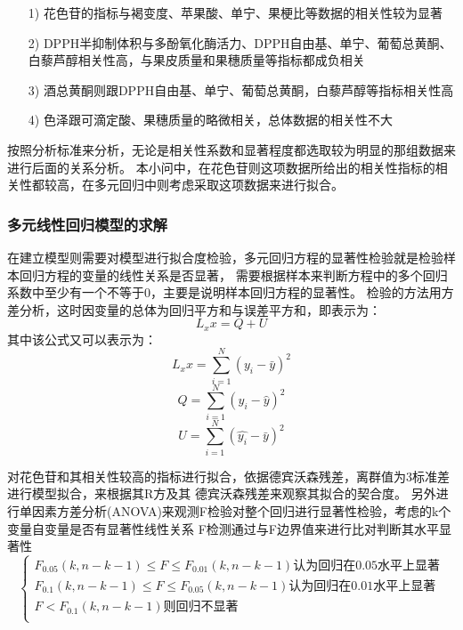 \documentclass[UTF8]{ctexart}
\begin{document}
\begin{itemize}
	\item [1)]{花色苷的指标与褐变度、苹果酸、单宁、果梗比等数据的相关性较为显著}
	\item [2)]{DPPH半抑制体积与多酚氧化酶活力、DPPH自由基、单宁、葡萄总黄酮、白藜芦醇相关性高，与果皮质量和果穗质量等指标都成负相关}
	\item [3)]{酒总黄酮则跟DPPH自由基、单宁、葡萄总黄酮，白藜芦醇等指标相关性高}
	\item [4)]{色泽跟可滴定酸、果穗质量的略微相关，总体数据的相关性不大}
\end{itemize}

按照分析标准来分析，无论是相关性系数和显著程度都选取较为明显的那组数据来进行后面的关系分析。
本小问中，在花色苷则这项数据所给出的相关性指标的相关性都较高，在多元回归中则考虑采取这项数据来进行拟合。

\subsubsection{多元线性回归模型的求解}
在建立模型则需要对模型进行拟合度检验，多元回归方程的显著性检验就是检验样本回归方程的变量的线性关系是否显著，
需要根据样本来判断方程中的多个回归系数中至少有一个不等于0，主要是说明样本回归方程的显著性。
检验的方法用方差分析，这时因变量的总体为回归平方和与误差平方和，即表示为：
\begin{equation}
	L_xx = Q+U
\end{equation}
其中该公式又可以表示为：
\begin{equation}
	L_xx=\sum_{i=1}^{N}(y_i-\bar{y})^2
\end{equation}
\begin{equation}
	Q=\sum_{i=1}^{N}(y_i-\hat{y})^2
\end{equation}
\begin{equation}
	U=\sum_{i=1}^{N}(\hat{y_i}-\bar{y})^2
\end{equation}

对花色苷和其相关性较高的指标进行拟合，依据德宾沃森残差，离群值为3标准差进行模型拟合，来根据其R方及其
德宾沃森残差来观察其拟合的契合度。
另外进行单因素方差分析(ANOVA)来观测F检验对整个回归进行显著性检验，考虑的k个变量自变量是否有显著性线性关系
F检测通过与F边界值来进行比对判断其水平显著性
\[\left\{\begin{array}{llcl}
		F_0.05(k,n-k-1) \le F \le F_0.01(k,n-k-1){认为回归在0.05水平上显著} \\

		F_0.1(k,n-k-1) \le F \le F_0.05(k,n-k-1){认为回归在0.01水平上显著}  \\

		F<F_0.1(k,n-k-1){则回归不显著}                                      \\
	\end{array} \right.\]
\end{document}

